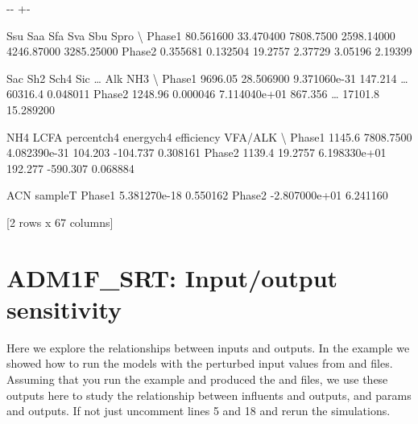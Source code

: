 \documentclass[a4paper,10pt,english]{sphinxmanual}
\newlength\nbsphinxcodecellspacing
\begin{document}
{

\kern-\sphinxverbatimsmallskipamount\kern-\baselineskip
\kern+\FrameHeightAdjust\kern-\fboxrule
\vspace{\nbsphinxcodecellspacing}

\begin{sphinxVerbatim}[commandchars=\\\{\}]
\llap{\color{nbsphinxout}[16]:\,\hspace{\fboxrule}\hspace{\fboxsep}}             Ssu        Saa        Sfa         Sva         Sbu        Spro   \textbackslash{}
Phase1  80.561600  33.470400  7808.7500  2598.14000  4246.87000  3285.25000
Phase2   0.355681   0.132504    19.2757     2.37729     3.05196     2.19399

           Sac        Sh2          Sch4      Sic   {\ldots}     Alk        NH3   \textbackslash{}
Phase1  9696.05  28.506900  9.371060e-31  147.214  {\ldots}  60316.4   0.048011
Phase2  1248.96   0.000046  7.114040e+01  867.356  {\ldots}  17101.8  15.289200

          NH4       LCFA    percentch4    energych4   efficiency   VFA/ALK  \textbackslash{}
Phase1  1145.6  7808.7500  4.082390e-31      104.203    -104.737  0.308161
Phase2  1139.4    19.2757  6.198330e+01      192.277    -590.307  0.068884

                 ACN   sampleT
Phase1  5.381270e-18  0.550162
Phase2 -2.807000e+01  6.241160

[2 rows x 67 columns]
\end{sphinxVerbatim}
}

{
\begin{sphinxVerbatim}[commandchars=\\\{\}]
\llap{\color{nbsphinxin}[ ]:\,\hspace{\fboxrule}\hspace{\fboxsep}}
\end{sphinxVerbatim}
}


\section{ADM1F\_SRT: Input/output sensitivity}
\label{\detokenize{jupyter_notebook/io_sensitivity_analysis:ADM1F_SRT:-Input/output-sensitivity}}\label{\detokenize{jupyter_notebook/io_sensitivity_analysis::doc}}
\sphinxAtStartPar
Here we explore the relationships between inputs and outputs. In the  example we showed how to run the models with the perturbed input values from  and  files. Assuming that you run the  example and produced the  and  files, we use these outputs here to study the relationship between influents and outputs, and params and outputs. If not just uncomment lines 5 and 18 and
re\sphinxhyphen{}run the simulations.
\end{document}
